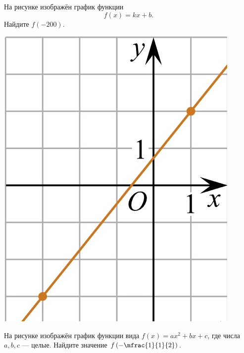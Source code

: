 \begin{class}[number=5]
	\begin{listofex}
			\item
			\begin{minipage}[t]{\bodywidth}
				На рисунке изображён график функции \[ f(x)=kx+b. \] Найдите \(f(-200)\).
			\end{minipage}
			\hspace{0.02\linewidth}
			\begin{minipage}[t]{\picwidth}
				\includegraphics[align=t, width=\linewidth]{../../pics/G101M4C4-1}
			\end{minipage}
			\item
			\begin{minipage}[t]{\bodywidth}
				На рисунке изображён график функции вида \(f(x)=ax^2+bx+c\), где числа \(a, b, c\) --- целые. Найдите значение \(f\left( -\mfrac{1}{1}{2} \right)\).
			\end{minipage}
			\hspace{0.02\linewidth}

\end{listofex}
\end{class}
